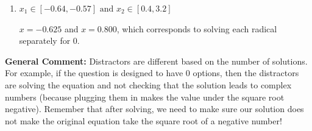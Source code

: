 \documentclass{extbook}[14pt]
\begin{document}
\begin{enumerate}
{\begin{enumerate}[label=\Alph*.]
This corresponds to not checking that the potential solution $x = -0.077$ leads to a complex value in the original equation.
\item \( x_1 \in [-0.64, -0.57] \text{ and } x_2 \in [0.4,3.2] \)

$x = -0.625$ and $x = 0.800$, which corresponds to solving each radical separately for 0.
\end{enumerate}

\textbf{General Comment:} Distractors are different based on the number of solutions. For example, if the question is designed to have 0 options, then the distractors are solving the equation and not checking that the solution leads to complex numbers (because plugging them in makes the value under the square root negative). Remember that after solving, we need to make sure our solution does not make the original equation take the square root of a negative number!
}
\end{enumerate}
\end{document}
